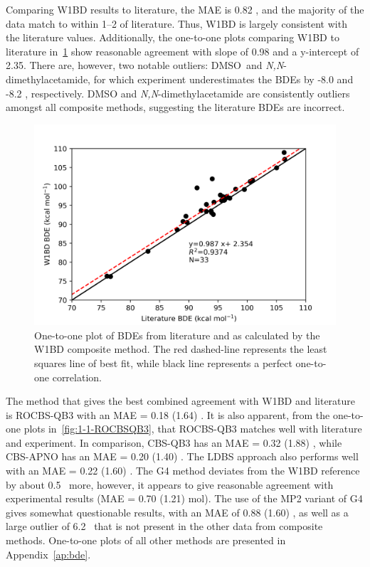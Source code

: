 Comparing W1BD results to literature, the MAE is 0.82 \kcalmol, and the
majority of the data match to within 1--2 \kcalmol of literature. Thus, W1BD is
largely consistent with the literature values. Additionally, the one-to-one
plots comparing W1BD to literature in~\ref{fig:1-1-W1BD} show reasonable
agreement with slope of 0.98 and a y-intercept of 2.35. There are, however, two
notable outliers: DMSO\footnotemark\ and \emph{N,N}-dimethylacetamide, for
which experiment underestimates the BDEs by -8.0 and -8.2 \kcalmol,
respectively. DMSO and \emph{N,N}-dimethylacetamide are consistently outliers
amongst all composite methods, suggesting the literature BDEs are incorrect.


\begin{figure}[H]
  \centering
  \includegraphics[width=\textwidth]{figures/lit-w1bd}
  \caption[One-to-one plot of BDEs from literature and as calculated by the
  W1BD composite method.]{One-to-one plot of BDEs from
  literature\protect\cite{Luo2002} and as calculated by the W1BD composite
  method. The red dashed-line represents the least squares line of best fit,
  while black line represents a perfect one-to-one correlation.}
  \label{fig:1-1-W1BD}
\end{figure}

The method that gives the best combined agreement with W1BD and literature is
ROCBS-QB3 with an MAE = 0.18 (1.64) \kcalmol. It is also apparent, from the
one-to-one plots in~\ref{fig:1-1-ROCBSQB3}, that ROCBS-QB3 matches well with
literature and experiment. In comparison, CBS-QB3 has an MAE = 0.32 (1.88)
\kcalmol, while CBS-APNO has an MAE = 0.20 (1.40) \kcalmol. The LDBS approach
also performs well with an MAE = 0.22 (1.60) \kcalmol. The G4 method deviates
from the W1BD reference by about 0.5 \kcalmol\ more, however, it appears to
give reasonable agreement with experimental results (MAE = 0.70 (1.21) mol).
The use of the MP2 variant of G4 gives somewhat questionable results, with an
MAE of 0.88 (1.60) \kcalmol, as well as a large outlier of 6.2 \kcalmol\ that
is not present in the other data from composite methods. One-to-one plots of
all other methods are presented in Appendix~\ref{ap:bde}.

